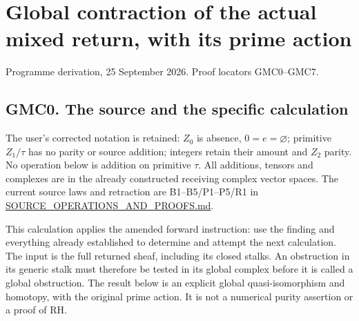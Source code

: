 \section{Global contraction of the actual mixed return, with its prime
action}\label{global-contraction-of-the-actual-mixed-return-with-its-prime-action}

Programme derivation, 25 September 2026. Proof locators GMC0--GMC7.

\subsection{GMC0. The source and the specific
calculation}\label{gmc0.-the-source-and-the-specific-calculation}

The user's corrected notation is retained: \(Z_0\) is absence,
\(0=e=\varnothing\); primitive \(Z_1/\tau\) has no parity or source
addition; integers retain their amount and \(Z_2\) parity. No operation
below is addition on primitive \(\tau\). All additions, tensors and
complexes are in the already constructed receiving complex vector
spaces. The current source laws and retraction are B1--B5/P1--P5/R1 in
\href{https://github.com/KokunoYumeto/zeta-function-research-reader/blob/36a82ecca98addb8a98b48204e349737856c7223/workbenches/splitzero-tandem/continuations/20260924-cohomology-weight-and-character-lifts/original-character-lifting/foundations/user_definitions_20260924/SOURCE_OPERATIONS_AND_PROOFS.md}{SOURCE\_OPERATIONS\_AND\_PROOFS.md}.

This calculation applies the amended forward instruction: use the
finding and everything already established to determine and attempt the
next calculation. The input is the full returned sheaf, including its
closed stalks. An obstruction in its generic stalk must therefore be
tested in its global complex before it is called a global obstruction.
The result below is an explicit global quasi-isomorphism and homotopy,
with the original prime action. It is not a numerical purity assertion
or a proof of RH.

